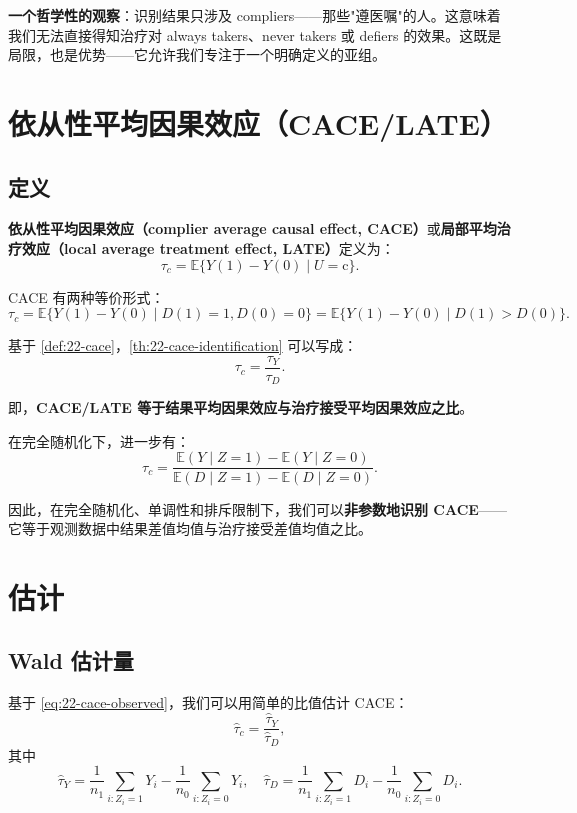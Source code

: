 \textbf{一个哲学性的观察}：识别结果只涉及 compliers——那些"遵医嘱"的人。这意味着我们无法直接得知治疗对 always takers、never takers 或 defiers 的效果。这既是局限，也是优势——它允许我们专注于一个明确定义的亚组。

\section{依从性平均因果效应（CACE/LATE）}\label{sec:22-cace}

\subsection{定义}\label{sec:22-cace-definition}

\begin{Definition}\label{def:22-cace}
\textbf{依从性平均因果效应（complier average causal effect, CACE）}或\textbf{局部平均治疗效应（local average treatment effect, LATE）}定义为：
\[
\tau_c = \mathbb{E}\{Y(1) - Y(0) \mid U = \text{c}\}.
\]
\end{Definition}

CACE 有两种等价形式：
\[
\tau_c = \mathbb{E}\{Y(1) - Y(0) \mid D(1) = 1, D(0) = 0\} = \mathbb{E}\{Y(1) - Y(0) \mid D(1) > D(0)\}.
\]

基于 \cref{def:22-cace}，\cref{th:22-cace-identification} 可以写成：
\[
\tau_c = \frac{\tau_Y}{\tau_D}.
\label{eq:22-cace-ratio}
\]

即，\textbf{CACE/LATE 等于结果平均因果效应与治疗接受平均因果效应之比}。

在完全随机化下，进一步有：
\[
\tau_c = \frac{\mathbb{E}(Y \mid Z = 1) - \mathbb{E}(Y \mid Z = 0)}{\mathbb{E}(D \mid Z = 1) - \mathbb{E}(D \mid Z = 0)}.
\label{eq:22-cace-observed}
\]

因此，在完全随机化、单调性和排斥限制下，我们可以\textbf{非参数地识别 CACE}——它等于观测数据中结果差值均值与治疗接受差值均值之比。

\section{估计}\label{sec:22-estimation}

\subsection{Wald 估计量}\label{sec:22-wald-estimator}

基于 \cref{eq:22-cace-observed}，我们可以用简单的比值估计 CACE：
\[
\hat{\tau}_c = \frac{\hat{\tau}_Y}{\hat{\tau}_D},
\label{eq:22-wald-estimator}
\]
其中
\[
\hat{\tau}_Y = \frac{1}{n_1} \sum_{i: Z_i=1} Y_i - \frac{1}{n_0} \sum_{i: Z_i=0} Y_i, \quad
\hat{\tau}_D = \frac{1}{n_1} \sum_{i: Z_i=1} D_i - \frac{1}{n_0} \sum_{i: Z_i=0} D_i.
\]

